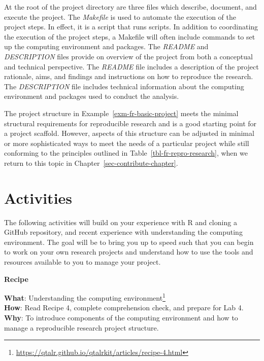 \documentclass[
  letterpaper,
]{latex/krantz}
\theoremstyle{definition}
\theoremstyle{remark}
\DeclareRobustCommand{\href}[2]{#2\footnote{\url{#1}}}
\begin{document}
At the root of the project directory are three files which describe,
document, and execute the project. The \emph{Makefile} is used to
automate the execution of the project steps. In effect, it is a script
that runs scripts. In addition to coordinating the execution of the
project steps, a Makefile will often include commands to set up the
computing environment and packages. The \emph{README} and
\emph{DESCRIPTION} files provide on overview of the project from both a
conceptual and technical perspective. The \emph{README} file includes a
description of the project rationale, aims, and findings and
instructions on how to reproduce the research. The \emph{DESCRIPTION}
file includes technical information about the computing environment and
packages used to conduct the analysis.

The project structure in Example~\ref{exm-fr-basic-project} meets the
minimal structural requirements for reproducible research and is a good
starting point for a project scaffold. However, aspects of this
structure can be adjusted in minimal or more sophisticated ways to meet
the needs of a particular project while still conforming to the
principles outlined in Table~\ref{tbl-fr-repro-research}, when we return
to this topic in Chapter~\ref{sec-contribute-chapter}.

\section*{Activities}\label{activities-2}


The following activities will build on your experience with R and
cloning a GitHub repository, and recent experience with understanding
the computing environment. The goal will be to bring you up to speed
such that you can begin to work on your own research projects and
understand how to use the tools and resources available to you to manage
your project.

\begin{tcolorbox}[enhanced jigsaw, colback=white, colframe=quarto-callout-color-frame, leftrule=.75mm, opacityback=0, rightrule=.15mm, bottomrule=.15mm, toprule=.15mm, breakable, left=2mm, arc=.35mm]

\textbf{ Recipe}

\textbf{What}:
\href{https://qtalr.github.io/qtalrkit/articles/recipe-4.html}{Understanding
the computing environment}\\
\textbf{How}: Read Recipe 4, complete comprehension check, and prepare
for Lab 4.\\
\textbf{Why}: To introduce components of the computing environment and
how to manage a reproducible research project structure.

\end{tcolorbox}
\end{document}
